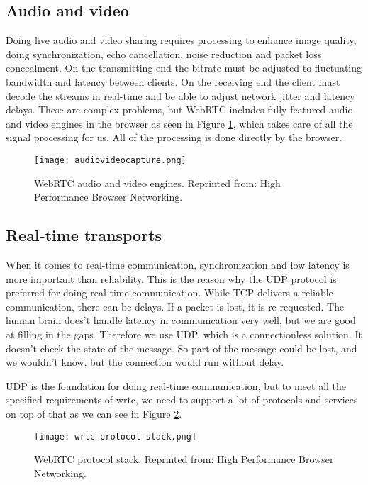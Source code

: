 \subsection{Audio and video}
Doing live audio and video sharing requires processing to enhance image quality, doing synchronization, echo cancellation, noise reduction and packet loss concealment\cite{grigorik_high_2013}. On the transmitting end the bitrate must be adjusted to fluctuating bandwidth and latency between clients. On the receiving end the client must decode the streams in real-time and be able to adjust network jitter and latency delays. These are complex problems, but WebRTC includes fully featured audio and video engines in the browser as seen in Figure \ref{fig:audiovideocapture}, which takes care of all the signal processing for us. All of the processing is done directly by the browser.

\begin{figure}[here]
\centerline{\texttt{[image: audiovideocapture.png]}}
\caption{WebRTC audio and video engines. Reprinted from: High Performance Browser Networking\cite{grigorik_high_2013}.}
\label{fig:audiovideocapture}
\end{figure}

\subsection{Real-time transports}
When it comes to real-time communication, synchronization and low latency is more important than reliability. This is the reason why the UDP protocol is preferred for doing real-time communication. While TCP delivers a reliable communication, there can be delays. If a packet is lost, it is re-requested. The human brain does't handle latency in communication very well, but we are good at filling in the gaps. Therefore we use UDP, which is a connectionless solution. It doesn't check the state of the message. So part of the message could be lost, and we wouldn't know, but the connection would run without delay.

UDP is the foundation for doing real-time communication, but to meet all the specified requirements of \gls{wrtc}, we need to support a lot of protocols and services on top of that as we can see in Figure \ref{fig:wrtc-protocol-stack}.

\begin{figure}[here]
\centerline{\texttt{[image: wrtc-protocol-stack.png]}}
\caption{WebRTC protocol stack. Reprinted from: High Performance Browser Networking\cite{grigorik_high_2013}.}
\label{fig:wrtc-protocol-stack}
\end{figure}

